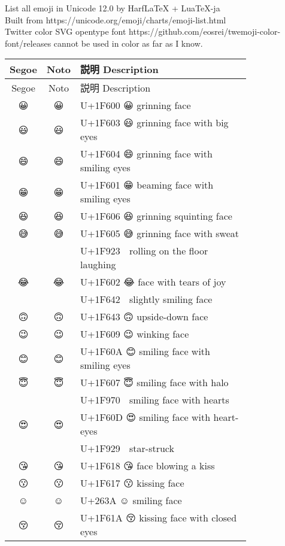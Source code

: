\documentclass[a4paper,12pt]{ltjarticle}
\newcommand{\fontA}[1]{{\fontspec[RawFeature={mode=harf,+dist,+ccmp}]{Segoe UI Emoji} #1}}
\newcommand{\fontB}[1]{{\fontspec[RawFeature={mode=harf,+dist,+ccmp}]{Noto Color Emoji} #1}}
\begin{document}
\noindent
List all emoji in Unicode 12.0 by HarfLaTeX + LuaTeX-ja\\
Built from https://unicode.org/emoji/charts/emoji-list.html\\
Twitter color SVG opentype font https://github.com/eosrei/twemoji-color-font/releases cannot be used in color as far as I know.

\noindent
\begin{longtable}[c]{ccp{0.8\linewidth}}
Segoe&Noto&説明 Description\\\hline
\endfirsthead  
Segoe&Noto&説明 Description\\\hline
\endhead  
\fontA{😀}&\fontB{😀}&U+1F600 😀 grinning face\\
\fontA{😃}&\fontB{😃}&U+1F603 😃 grinning face with big eyes\\
\fontA{😄}&\fontB{😄}&U+1F604 😄 grinning face with smiling eyes\\
\fontA{😁}&\fontB{😁}&U+1F601 😁 beaming face with smiling eyes\\
\fontA{😆}&\fontB{😆}&U+1F606 😆 grinning squinting face\\
\fontA{😅}&\fontB{😅}&U+1F605 😅 grinning face with sweat\\
\fontA{🤣}&\fontB{🤣}&U+1F923 🤣 rolling on the floor laughing\\
\fontA{😂}&\fontB{😂}&U+1F602 😂 face with tears of joy\\
\fontA{🙂}&\fontB{🙂}&U+1F642 🙂 slightly smiling face\\
\fontA{🙃}&\fontB{🙃}&U+1F643 🙃 upside-down face\\
\fontA{😉}&\fontB{😉}&U+1F609 😉 winking face\\
\fontA{😊}&\fontB{😊}&U+1F60A 😊 smiling face with smiling eyes\\
\fontA{😇}&\fontB{😇}&U+1F607 😇 smiling face with halo\\
\fontA{🥰}&\fontB{🥰}&U+1F970 🥰 smiling face with hearts\\
\fontA{😍}&\fontB{😍}&U+1F60D 😍 smiling face with heart-eyes\\
\fontA{🤩}&\fontB{🤩}&U+1F929 🤩 star-struck\\
\fontA{😘}&\fontB{😘}&U+1F618 😘 face blowing a kiss\\
\fontA{😗}&\fontB{😗}&U+1F617 😗 kissing face\\
\fontA{☺}&\fontB{☺}&U+263A ☺ smiling face\\
\fontA{😚}&\fontB{😚}&U+1F61A 😚 kissing face with closed eyes\\

\end{longtable}
\end{document}
